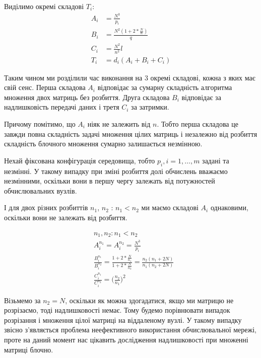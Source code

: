 Виділимо окремі складові $T_i$:
\begin{equation}
	\begin{aligned} 
		A_i &= \frac{N^3}{p_i} \\
		B_i &= \frac{N^2 ( 1 + 2*\frac{N}{n} )}{q} \\
		C_i &= \frac{N^2}{n^2} l \\
		T_i &= d_i ( A_i + B_i + C_i )
	\end{aligned} 
	\label{eq:T_i_parts}
\end{equation}

Таким чином ми розділили час виконання на 3 окремі складові, кожна з яких має свій сенс. Перша складова $A_i$ відповідає за сумарну складність алгоритма множення двох матриць без розбиття. Друга складова $B_i$ відповідає за надлишковість передачі даних і третя $C_i$ за затримки.

Причому помітимо, що $A_i$ ніяк не залежить від $n$. Тобто перша складова це завжди повна складність задачі множення цілих матриць і незалежно від розбиття складність блочного множення сумарно залишається незмінною.

Нехай фіксована конфігурація середовища, тобто $p_i, i=1,\ldots,m$ задані та незмінні. У такому випадку при зміні розбиття долі обчислень вважаємо незмінними, оскільки вони в першу чергу залежать від потужностей обчислювальних вузлів.

І для двох різних розбиттів $n_1$, $n_2$ : $n_1 < n_2$ ми маємо складові $A_i$ однаковими, оскільки вони не залежать від розбиття.

\begin{equation}
	\label{eq:diff_n1n2}
	\begin{aligned}
		& n_1, n_2 : n_1 < n_2
		\\
		&A_i^{n_1} = A_i^{n_2} = \frac{N^3}{p_i}
		\\
		&\frac{B_i^{n_1}}{B_i^{n_2}} = \frac{1 + 2*\frac{N}{n_1}}{1 + 2*\frac{N}{n_2}} =\frac{ n_2 ( n_1 + 2N ) }{n_1 ( n_2 + 2N )}
		\\
		&\frac{C_i^{n_1}}{C_i^{n_2}} = \bigg( \frac{n_2}{n_1} \bigg)^2
	\end{aligned}
\end{equation}

Візьмемо за $n_2=N$, оскільки як можна здогадатися, якщо ми матрицю не розрізаємо, тоді надлишковості немає. Тому будемо порівнювати випадок розрізання і множення цілої матриці на віддаленому вузлі. У такому випадку звісно з'являється проблема неефективного використання обчислювальної мережі, проте на даний момент нас цікавить дослідження надлишковості при множенні матриці блочно.

